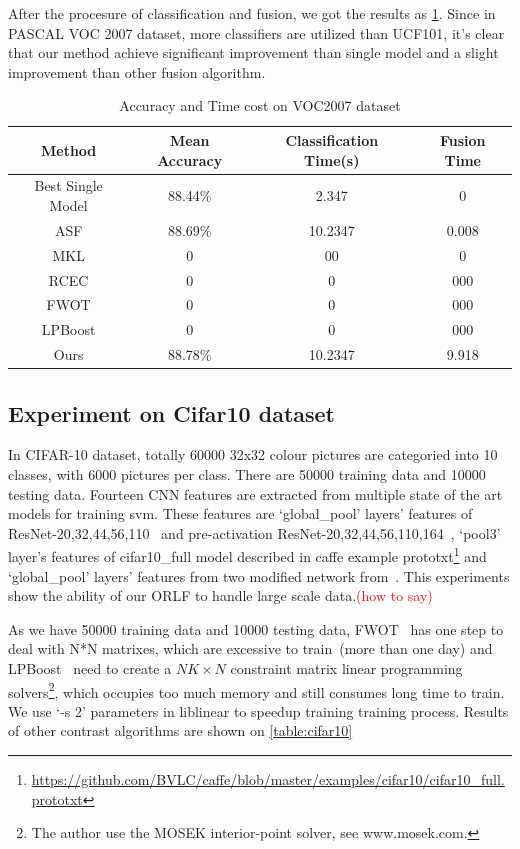 \documentclass[letterpaper]{article}
\def\yanred{\textcolor{red}}
\begin{document}
After the procesure of classification and fusion, we got the results as \ref{table:voc}. Since in PASCAL VOC 2007 dataset, more classifiers are utilized than UCF101, it's clear that our method achieve significant improvement than single model and a slight improvement than other fusion algorithm.

\begin{table}[!h]\scriptsize
\centering
\label{table:voc}
\begin{tabular}{c|c|c|c}
\hline
Method            & Mean Accuracy & Classification Time(s)& Fusion Time \\\hline
Best Single Model & 88.44\%       &  2.347                &      0    \\\hline
ASF               & 88.69\%       &  10.2347              &    0.008   \\ %
MKL               &     0 & 00 & 0 \\
RCEC              &     0 & 0 & 000 \\
FWOT              &     0 & 0 & 000 \\
LPBoost           &     0 & 0 & 000 \\\hline
Ours              & 88.78\%       & 10.2347               & 9.918 \\
\hline
\end{tabular}
\caption{Accuracy and Time cost on VOC2007 dataset}
\end{table}


\subsection{Experiment on Cifar10 dataset}
In CIFAR-10 dataset, totally 60000 32x32 colour pictures are categoried into 10 classes, with 6000 pictures per class. There are 50000 training data and 10000 testing data. Fourteen CNN features are extracted from multiple state of the art models for training svm. These features are `global\_pool' layers' features of ResNet-20,32,44,56,110~\cite{he2015deep} and pre-activation ResNet-20,32,44,56,110,164~\cite{he2016identity},  `pool3' layer's features of cifar10\_full model described in caffe example prototxt\footnote{\url{https://github.com/BVLC/caffe/blob/master/examples/cifar10/cifar10_full.prototxt}} and `global\_pool' layers' features from two modified network from~\cite{szegedy2015going,chatfield2014return}. This experiments show the ability of our ORLF to handle large scale data.\yanred{(how to say)}

As we have 50000 training data and 10000 testing data, FWOT~\cite{xuiccv2013feature} has one step to deal with N*N matrixes, which are excessive to train~(more than one day) and LPBoost~\cite{gehler2009feature} need to create a $NK\times N$ constraint matrix linear programming solvers\footnote{The author use the MOSEK interior-point solver, see www.mosek.com.}, which occupies too much memory and still consumes long time to train. We use `-s 2' parameters in liblinear to speedup training training process. Results of other contrast algorithms are shown on \ref{table:cifar10}
\end{document}
